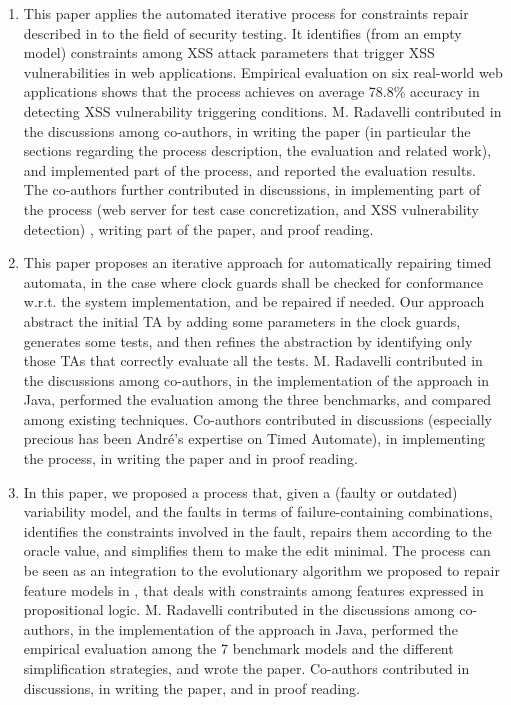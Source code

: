 \begin{enumerate}
	\item \cite{garn2019} 
	
	This paper applies the automated iterative process for constraints repair described in \cite{gargantini_combinatorial_2017} to the field of security testing. It identifies (from an empty model) constraints among XSS attack parameters that trigger XSS vulnerabilities in web applications. Empirical evaluation on six real-world web applications shows that the process achieves on average 78.8\% accuracy in detecting XSS vulnerability triggering conditions.
	M. Radavelli contributed in the discussions among co-authors, in writing the paper (in particular the sections regarding the process description, the evaluation and related work), and implemented part of the process, and reported the evaluation results.
	The co-authors further contributed in discussions, in implementing part of the process (web server for test case concretization, and XSS vulnerability detection) , writing part of the paper, and proof reading.
	
	\item \cite{andre_tap_2019} 

	This paper proposes an iterative approach for automatically repairing timed automata, in the case where clock guards shall be checked for conformance w.r.t. the system implementation, and be repaired if needed. 
	Our approach abstract the initial TA by adding some parameters in the clock guards, generates some tests, and then refines the abstraction by identifying only those TAs that correctly evaluate all the tests.
	M. Radavelli contributed in the discussions among co-authors, in the implementation of the approach in Java, performed the evaluation among the three benchmarks, and compared among existing techniques.
	Co-authors contributed in discussions (especially precious has been André's expertise on Timed Automate), in implementing the process, in writing the paper and in proof reading.
	
	\item \cite{arcaini2019varivolution} 

	In this paper, we proposed a process that, given a (faulty or outdated) variability model, and the faults in terms of failure-containing combinations, identifies the constraints involved in the fault, repairs them according to the oracle value, and simplifies them to make the edit minimal. 
	The process can be seen as an integration to the evolutionary algorithm we proposed to repair feature models in \cite{arcaini_evolutionary_2018,arcaini2019achieving}, that deals with constraints among features expressed in propositional logic. 
	M. Radavelli contributed in the discussions among co-authors, in the implementation of the approach in Java, performed the empirical evaluation among the 7 benchmark models and the different simplification strategies, and wrote the paper.
	Co-authors contributed in discussions, in writing the paper, and in proof reading.

\end{enumerate}

